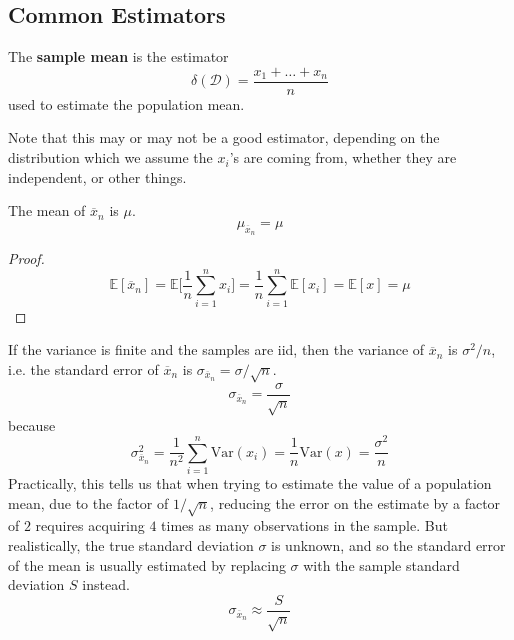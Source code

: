 \subsection{Common Estimators} 

  \begin{definition} 
    The \textbf{sample mean} is the estimator 
    \begin{equation}
      \delta(\mathcal{D}) = \frac{x_1 + \ldots + x_n}{n}
    \end{equation} 
    used to estimate the population mean.
  \end{definition}

  Note that this may or may not be a good estimator, depending on the distribution which we assume the $x_i$'s are coming from, whether they are independent, or other things.

  \begin{lemma}[Mean]
    The mean of $\overline{x}_n$ is $\mu$. 
    \begin{equation}
      \mu_{\overline{x}_n} = \mu
    \end{equation}
  \end{lemma}
  \begin{proof}
    \begin{equation}
      \mathbb{E}[\overline{x}_n] = \mathbb{E} \bigg[ \frac{1}{n} \sum_{i=1}^n x_i \bigg] = \frac{1}{n} \sum_{i=1}^n \mathbb{E}[x_i] = \mathbb{E}[x] = \mu
    \end{equation}
  \end{proof}

  \begin{lemma}[Variance]
    If the variance is finite and the samples are iid, then the variance of $\overline{x}_n$ is $\sigma^2 / n$, i.e. the standard error of $\overline{x}_n$ is $\sigma_{\overline{x}_n} = \sigma / \sqrt{n}$. 
    \begin{equation}
      \sigma_{\overline{x}_n} = \frac{\sigma}{\sqrt{n}}
    \end{equation}
    because 
    \begin{equation}
      \sigma^2_{\overline{x}_n} = \frac{1}{n^2} \sum_{i=1}^n \mathrm{Var}(x_i) = \frac{1}{n} \mathrm{Var}(x) = \frac{\sigma^2}{n}
    \end{equation}
     Practically, this tells us that when trying to estimate the value of a population mean, due to the factor of $1/\sqrt{n}$, reducing the error on the estimate by a factor of $2$ requires acquiring $4$ times as many observations in the sample. But realistically, the true standard deviation $\sigma$ is unknown, and so the standard error of the mean is usually estimated by replacing $\sigma$ with the sample standard deviation $S$ instead. 
    \begin{equation}
      \sigma_{\overline{x}_n} \approx \frac{S}{\sqrt{n}}
    \end{equation}
  \end{lemma}

